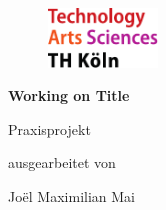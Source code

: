 \begin{titlepage}

\begin{center}

\begin{figure}[!ht]
		\includegraphics[width=0.26\textwidth]{images/THlogoheader.pdf}
\end{figure}

\vspace{0.4cm}

\begin{rmfamily}
\begin{huge}
\textbf{Working on Title}\\	
\end{huge}
\end{rmfamily}

\vspace{0.8cm}



\begin{LARGE}
\begin{scshape}
Praxisprojekt\\[0.8em]
\end{scshape}
\end{LARGE}

\begin{large}
ausgearbeitet von\\ 
\vspace{0.3cm}
\begin{LARGE}
Joël Maximilian Mai\\
\end{LARGE}
\end{large}


\end{center}
\end{titlepage}
